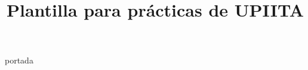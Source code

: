 \documentclass[class=article, crop=false]{standalone}
\title{Plantilla para prácticas de UPIITA}
\begin{document}
{portada}


\tableofcontents
\newpage
\end{document}
